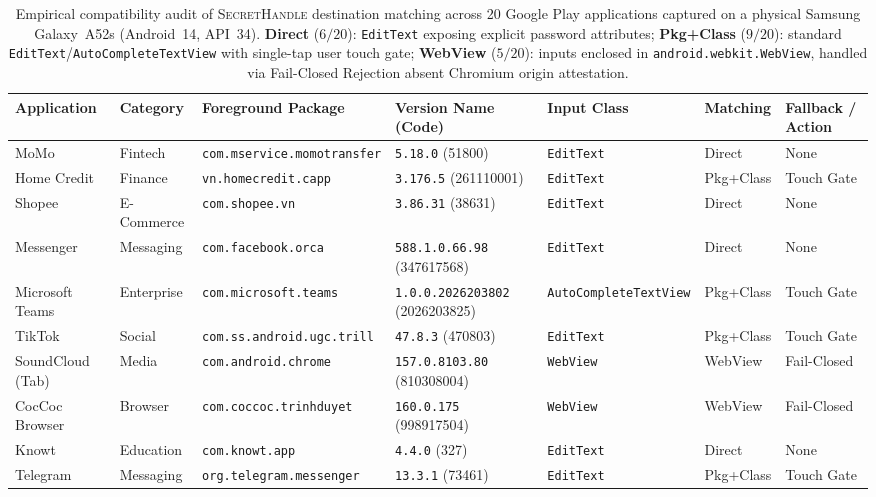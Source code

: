 \documentclass[sigconf,10pt]{acmart}
\newcommand{\SH}{\textsc{SecretHandle}}
\theoremstyle{acmplain}%
\begin{document}
\begin{table}[t]
\centering\scriptsize
\renewcommand{\arraystretch}{0.95}
\setlength{\tabcolsep}{3.5pt}
\caption{Empirical compatibility audit of \SH{} destination matching across 20 Google Play applications captured on a physical Samsung Galaxy~A52s (Android~14, API~34). \textbf{Direct} ($6/20$): \texttt{EditText} exposing explicit password attributes; \textbf{Pkg+Class} ($9/20$): standard \texttt{EditText}/\texttt{AutoCompleteTextView} with single-tap user touch gate; \textbf{WebView} ($5/20$): inputs enclosed in \texttt{android.webkit.WebView}, handled via Fail-Closed Rejection absent Chromium origin attestation.}
\label{tab:app_compatibility}
\begin{tabular*}{\textwidth}{@{\extracolsep{\fill}}lllllll@{}}
\toprule
Application & Category & Foreground Package & Version Name (Code) & Input Class & Matching & Fallback / Action \\
\midrule
MoMo & Fintech & \texttt{com.mservice.momotransfer} & \texttt{5.18.0} (51800) & \texttt{EditText} & Direct & None \\
Home Credit & Finance & \texttt{vn.homecredit.capp} & \texttt{3.176.5} (261110001) & \texttt{EditText} & Pkg+Class & Touch Gate \\
Shopee & E-Commerce & \texttt{com.shopee.vn} & \texttt{3.86.31} (38631) & \texttt{EditText} & Direct & None \\
Messenger & Messaging & \texttt{com.facebook.orca} & \texttt{588.1.0.66.98} (347617568) & \texttt{EditText} & Direct & None \\
Microsoft Teams & Enterprise & \texttt{com.microsoft.teams} & \texttt{1.0.0.2026203802} (2026203825) & \texttt{AutoCompleteTextView} & Pkg+Class & Touch Gate \\
TikTok & Social & \texttt{com.ss.android.ugc.trill} & \texttt{47.8.3} (470803) & \texttt{EditText} & Pkg+Class & Touch Gate \\
SoundCloud (Tab) & Media & \texttt{com.android.chrome} & \texttt{157.0.8103.80} (810308004) & \texttt{WebView} & WebView & Fail-Closed \\
CocCoc Browser & Browser & \texttt{com.coccoc.trinhduyet} & \texttt{160.0.175} (998917504) & \texttt{WebView} & WebView & Fail-Closed \\
Knowt & Education & \texttt{com.knowt.app} & \texttt{4.4.0} (327) & \texttt{EditText} & Direct & None \\
Telegram & Messaging & \texttt{org.telegram.messenger} & \texttt{13.3.1} (73461) & \texttt{EditText} & Pkg+Class & Touch Gate \\

\end{tabular*}
\end{table}
\end{document}
